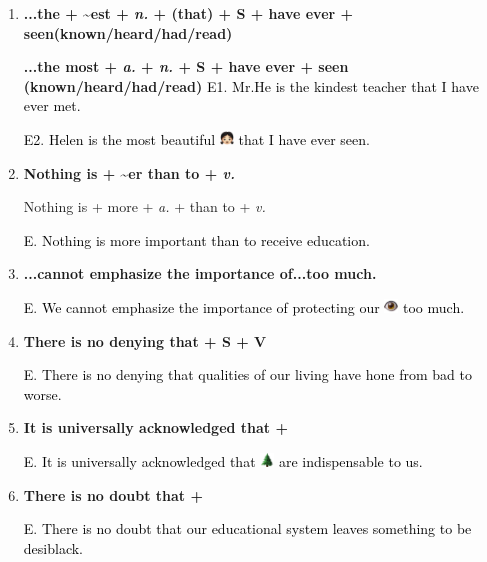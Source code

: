 \documentclass{article}
\begin{document}
\begin{enumerate}
\item \textbf{...the + \textasciitilde est + \emph{n.} + (that) + S + have ever +
  seen(known/heard/had/read)}
  
\textbf{...the most + \emph{a.} + \emph{n.} + S + have ever + seen (known/heard/had/read)}
  \textcolor{black}{E1}. \textcolor{black} {Mr.He is the kindest teacher that I have ever
    met.}
  
  \textcolor{black}{E2}. \textcolor{black} {Helen is the most beautiful
  }\includegraphics[height=1em]{girl} \textcolor{black}{that I have ever seen}.

\item \textbf{Nothing is + \textasciitilde er than to + \emph{v.}}
  
  Nothing is + more + \emph{a.} + than to + \emph{v.}
  
  \textcolor{black}{E}. \textcolor{black}{Nothing is more important than to receive
    education.}


\item \textbf{...cannot emphasize the importance of...too much.}
  
  \textcolor{black}E. \textcolor{black}{We cannot emphasize the importance of protecting
    our } \includegraphics[height=1em]{eye} \textcolor{black}{too much.}

\item \textbf{There is no denying that + S + V}

  \textcolor{black}E. \textcolor{black}{There is no denying that qualities of our living have
    hone from bad to worse.}

\item \textbf{It is universally acknowledged that +}

  \textcolor{black}E. \textcolor{black}{It is universally acknowledged that}
  \includegraphics[height=1em]{tree} \textcolor{black}{are indispensable to us.}

\item \textbf{There is no doubt that +}

\textcolor{black}E. \textcolor{black}{There is no doubt that our educational system leaves
  something to be desiblack.}


\end{enumerate}
\end{document}
